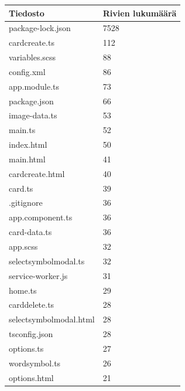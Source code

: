 \documentclass[utf8]{gradu3}
\begin{document}
\begin{center}
    \begin{tabular}{ | l | l |}
    \hline
    \textbf{Tiedosto} & \textbf{Rivien lukumäärä} \\ \hline
    package-lock.json & 7528 \\ \hline
    cardcreate.ts & 112 \\ \hline
    variables.scss & 88 \\ \hline
    config.xml & 86 \\ \hline
    app.module.ts & 73 \\ \hline
    package.json & 66 \\ \hline
    image-data.ts & 53 \\ \hline
    main.ts & 52 \\ \hline
    index.html & 50 \\ \hline
    main.html & 41 \\ \hline
    cardcreate.html & 40 \\ \hline
    card.ts & 39 \\ \hline
    .gitignore & 36 \\ \hline
    app.component.ts & 36 \\ \hline
    card-data.ts & 36 \\ \hline
    app.scss & 32 \\ \hline
    selectsymbolmodal.ts & 32 \\ \hline
    service-worker.js & 31 \\ \hline
    home.ts & 29 \\ \hline
    carddelete.ts & 28 \\ \hline
    selectsymbolmodal.html & 28 \\ \hline
    tsconfig.json & 28 \\ \hline
    options.ts & 27 \\ \hline
    wordsymbol.ts & 26 \\ \hline
    options.html & 21 \\ \hline
    \end{tabular}
\end{center}
\end{document}
